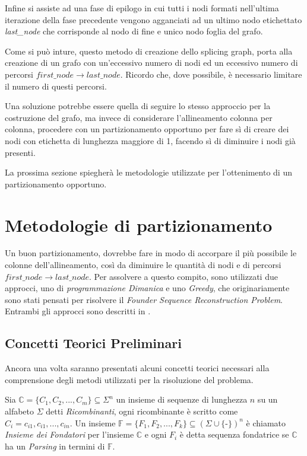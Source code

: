 Infine si assiste ad una fase di epilogo in cui tutti i nodi formati nell'ultima iterazione della fase precedente vengono agganciati ad un ultimo nodo etichettato \textit{last\_node} che corrisponde al nodo di fine e unico nodo foglia del grafo.

Come si può inture, questo metodo di creazione dello splicing graph, porta alla creazione di un grafo con un'eccessivo numero di nodi ed un eccessivo numero di percorsi $first\_node \to last\_node$. Ricordo che, dove possibile, è necessario limitare il numero di questi percorsi.

Una soluzione potrebbe essere quella di seguire lo stesso approccio per la costruzione del grafo, ma invece di considerare l'allineamento colonna per colonna, procedere con un partizionamento opportuno per fare sì di creare dei nodi con etichetta di lunghezza maggiore di 1, facendo sì di diminuire i nodi già presenti.

La prossima sezione spiegherà le metodologie utilizzate per l'ottenimento di un partizionamento opportuno.

\section{Metodologie di partizionamento}
Un buon partizionamento, dovrebbe fare in modo di accorpare il più possibile le colonne dell'allineamento, così da diminuire le quantità di nodi e di percorsi $first\_node \to last\_node$. Per assolvere a questo compito, sono utilizzati due approcci, uno di \textit{programmazione Dimanica} e uno \textit{Greedy}, che originariamente sono stati pensati per risolvere il \textit{Founder Sequence Reconstruction Problem}. Entrambi gli approcci sono descritti in \cite{ukkonen}.

\subsection{Concetti Teorici Preliminari}
Ancora una volta saranno presentati alcuni concetti teorici necessari alla comprensione degli metodi utilizzati per la risoluzione del problema.

Sia $\mathbb{C}=\{C_1,C_2,...,C_m\} \subseteq \Sigma^n$ un insieme di sequenze di lunghezza $n$ su un alfabeto $\Sigma$ detti \textit{Ricombinanti}, ogni ricombinante è scritto come $C_i=c_{i1},c_{i1},...,c_{in}$. Un insieme $\mathbb{F}=\{F_1,F_2,...,F_k\} \subseteq (\Sigma \cup \{\textit{-}\})^n$ è chiamato \textit{Insieme dei Fondatori} per
l'insieme $\mathbb{C}$ e ogni $F_i$ è detta sequenza fondatrice se $\mathbb{C}$ ha un \textit{Parsing} in termini di $\mathbb{F}$. 

